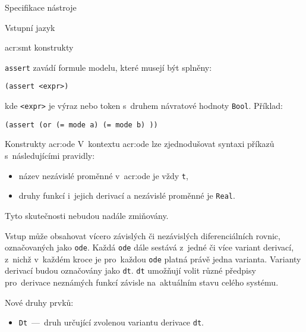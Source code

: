 \documentclass[thesis=M,czech]{FITthesis}[2012/06/26]
\newcommand{\acrlabel}[1]{acr:#1}
\newcommand{\acr}[1]{\acrshort{\acrlabel{#1}}}
\newcommand{\id}[1]{\texttt{#1}}
\begin{document}
\begin{section}{Specifikace nástroje}
\begin{subsection}{Vstupní jazyk}
\begin{subsubsection}{\acr{smt} konstrukty}

\begin{paragraph}{\id{assert}}\label{p:design:spec:ilang:smt:assert}
zavádí formule modelu, které musejí být splněny:
\begin{center}
\id{(assert <expr>)}
\end{center}
kde \id{<expr>} je výraz nebo token s~druhem návratové hodnoty \id{Bool}.
Příklad:
\begin{center}
\id{(assert (or (= mode a) (= mode b) ))}
\end{center}
\end{paragraph} %


\end{subsubsection} %


\begin{subsubsection}{Konstrukty \acr{ode}}
\label{sss:design:spec:ilang:ode}
V~kontextu \acr{ode} lze zjednodušovat
syntaxi příkazů s~následujícími pravidly:
\begin{itemize}
\item název nezávislé proměnné v~\acr{ode} je vždy \id{t},
\item druhy funkcí i~jejich derivací a nezávislé proměnné je \id{Real}.
\end{itemize}
Tyto skutečnosti nebudou nadále zmiňovány.

Vstup může obsahovat vícero závislých či nezávislých
diferenciálních rovnic, označovaných jako \id{ode}.
Každá \id{ode} dále sestává z~jedné či více variant derivací,
z~nichž v~každém kroce je pro~každou \id{ode} platná právě jedna varianta.
Varianty derivací budou označovány jako \id{dt}.
\id{dt} umožňují volit různé předpisy pro~derivace neznámých funkcí
závisle na~aktuálním stavu celého systému.


\begin{paragraph}{Nové druhy prvků:}\label{p:design:spec:ilang:ode:sorts}
\begin{itemize}
\item \id{Dt}~---~druh určující zvolenou variantu derivace \id{dt}.
\end{itemize}
\end{paragraph} %



\end{subsubsection}
\end{subsection}
\end{section}
\end{document}
